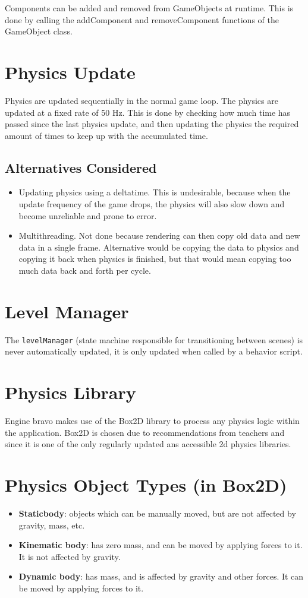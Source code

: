 \documentclass[draft]{article}
\begin{document}
Components can be added and removed from GameObjects at runtime. This is done by calling the addComponent and removeComponent functions of the GameObject class.


\section{Physics Update}
Physics are updated sequentially in the normal game loop.
The physics are updated at a fixed rate of 50 Hz. This is done by checking how much time has passed since the last physics update, and then updating the physics the required amount of times to keep up with the accumulated time.

\subsection{Alternatives Considered}
\begin{itemize}
  \item Updating physics using a deltatime. This is undesirable, because when the update frequency of the game drops, the physics will also slow down and become unreliable and prone to error.
  \item Multithreading. Not done because rendering can then copy old data and new data in a single frame. Alternative would be copying the data to physics and copying it back when physics is finished, but that would mean copying too much data back and forth per cycle.
\end{itemize}

\section{Level Manager}
The \texttt{levelManager} (state machine responsible for transitioning between scenes) is never automatically updated, it is only updated when called by a behavior script.

\section{Physics Library}
Engine bravo makes use of the Box2D library to process any physics logic within the application. Box2D is chosen due to recommendations from teachers and since it is one of the only regularly updated ans accessible 2d physics libraries.

\section{Physics Object Types (in Box2D)}
\begin{itemize}
  \item \textbf{Staticbody}: objects which can be manually moved, but are not affected by gravity, mass, etc.
  \item \textbf{Kinematic body}: has zero mass, and can be moved by applying forces to it. It is not affected by gravity.
  \item \textbf{Dynamic body}: has mass, and is affected by gravity and other forces. It can be moved by applying forces to it.
\end{itemize}
\end{document}

